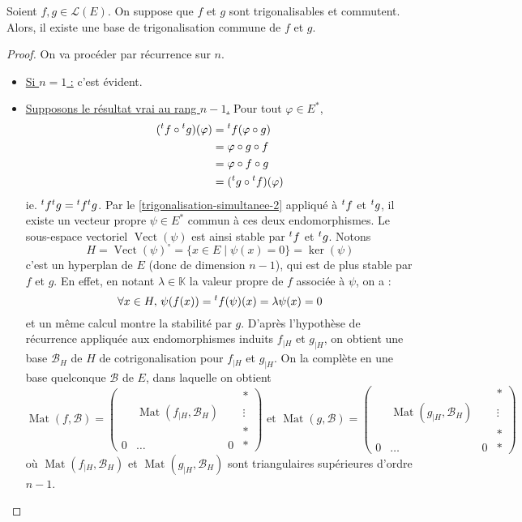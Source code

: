   \begin{theorem}
    Soient $f, g \in \mathcal{L}(E)$. On suppose que $f$ et $g$ sont trigonalisables et commutent. Alors, il existe une base de trigonalisation commune de $f$ et $g$.
  \end{theorem}

  \begin{proof}
    On va procéder par récurrence sur $n$.
    \begin{itemize}
      \item \underline{Si $n = 1$ :} c'est évident.
      \item \underline{Supposons le résultat vrai au rang $n - 1$.} Pour tout $\varphi \in E^*$,
      \begin{align*}
        (\mathstrut ^t f \circ \mathstrut ^t g)(\varphi) &= \mathstrut ^t f (\varphi \circ g) \\
        &= \varphi \circ g \circ f \\
        &= \varphi \circ f \circ g \\
        &= (\mathstrut ^t g \circ \mathstrut ^t f)(\varphi)
      \end{align*}
      ie. $\mathstrut ^t f \mathstrut ^t g = \mathstrut ^t f \mathstrut ^t g$. Par le \cref{trigonalisation-simultanee-2} appliqué à $\mathstrut ^t f$ et $\mathstrut ^t g$, il existe un vecteur propre $\psi \in E^*$ commun à ces deux endomorphismes. Le sous-espace vectoriel $\operatorname{Vect}(\psi)$ est ainsi stable par $\mathstrut ^t f$ et $\mathstrut ^t g$. Notons
      \[ H = \operatorname{Vect}(\psi)^{\circ} = \{ x \in E \mid \psi (x) = 0 \} = \ker(\psi) \]
      c'est un hyperplan de $E$ (donc de dimension $n-1$), qui est de plus stable par $f$ et $g$. En effet, en notant $\lambda \in \mathbb{K}$ la valeur propre de $f$ associée à $\psi$, on a :
      \[ \forall x \in H, \, \psi(f(x)) = \mathstrut ^t f(\psi)(x) = \lambda \psi(x) = 0 \]
      et un même calcul montre la stabilité par $g$. D'après l'hypothèse de récurrence appliquée aux endomorphismes induits $f_{|H}$ et $g_{|H}$, on obtient une base $\mathcal{B}_H$ de $H$ de cotrigonalisation pour $f_{|H}$ et $g_{|H}$. On la complète en une base quelconque $\mathcal{B}$ de $E$, dans laquelle on obtient
      \[
        \operatorname{Mat}(f, \mathcal{B}) =
        \begin{pmatrix}
          & & & * \\
          & \operatorname{Mat}(f_{|H}, \mathcal{B}_H) & & \vdots \\
          & & & * \\
          0 & \dots & 0 & *
        \end{pmatrix}
        \text{ et }
        \operatorname{Mat}(g, \mathcal{B}) =
        \begin{pmatrix}
          & & & * \\
          & \operatorname{Mat}(g_{|H}, \mathcal{B}_H) & & \vdots \\
          & & & * \\
          0 & \dots & 0 & *
        \end{pmatrix}
      \]
      où $\operatorname{Mat}(f_{|H}, \mathcal{B}_H)$ et $\operatorname{Mat}(g_{|H}, \mathcal{B}_H)$ sont triangulaires supérieures d'ordre $n-1$.
    \end{itemize}
  \end{proof}

